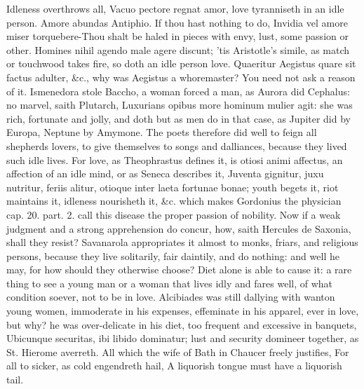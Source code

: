 {Idleness overthrows all, Vacuo pectore regnat amor, love tyranniseth in
an idle person. Amore abundas Antiphio. If thou hast nothing to
do, Invidia vel amore miser torquebere-Thou shalt be haled in
pieces with envy, lust, some passion or other. Homines nihil agendo
male agere discunt; 'tis Aristotle's simile, as match or
touchwood takes fire, so doth an idle person love. Quaeritur Aegistus
quare sit factus adulter, \&c., why was Aegistus a whoremaster? You need
not ask a reason of it. Ismenedora stole Baccho, a woman forced a man,
as Aurora did Cephalus: no marvel, saith Plutarch,
Luxurians opibus more hominum mulier agit: she was rich, fortunate and
jolly, and doth but as men do in that case, as Jupiter did by Europa,
Neptune by Amymone. The poets therefore did well to feign all shepherds
lovers, to give themselves to songs and dalliances, because they lived
such idle lives. For love, as Theophrastus defines it, is otiosi
animi affectus, an affection of an idle mind, or as Seneca
describes it, Juventa gignitur, juxu nutritur, feriis alitur, otioque
inter laeta fortunae bonae; youth begets it, riot maintains it,
idleness nourisheth it, \&c. which makes  Gordonius the physician
cap. 20. part. 2. call this disease the proper passion of nobility. Now
if a weak judgment and a strong apprehension do concur, how, saith
Hercules de Saxonia, shall they resist? Savanarola appropriates it
almost to monks, friars, and religious persons, because they live
solitarily, fair daintily, and do nothing: and well he may, for how
should they otherwise choose?
Diet alone is able to cause it: a rare thing to see a young man or a
woman that lives idly and fares well, of what condition soever, not to
be in love. Alcibiades was still dallying with wanton young
women, immoderate in his expenses, effeminate in his apparel, ever in
love, but why? he was over-delicate in his diet, too frequent and
excessive in banquets, Ubicunque securitas, ibi libido dominatur; lust
and security domineer together, as St. Hierome averreth. All which the
wife of Bath in Chaucer freely justifies,
For all to sicker, as cold engendreth hail,
A liquorish tongue must have a liquorish tail.

}
